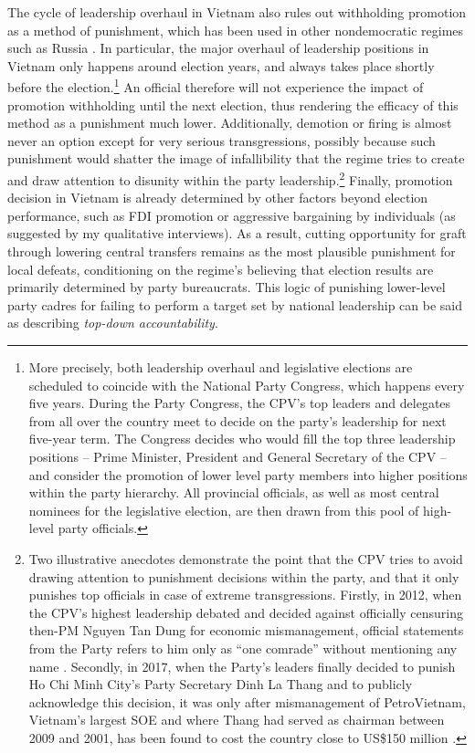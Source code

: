 \documentclass[12pt]{article}\usepackage[]{graphicx}\usepackage[]{color}
\newcommand{\1}{\mathbbm{1}}
\begin{document}
The cycle of leadership overhaul in Vietnam also rules out withholding promotion as a method of punishment, which has been used in other nondemocratic regimes such as Russia \citep[][136]{Myagkov2009}. In particular, the major overhaul of leadership positions in Vietnam only happens around election years, and always takes place shortly before the election.\footnote{More precisely, both leadership overhaul and legislative elections are scheduled to coincide with the National Party Congress, which happens every five years. During the Party Congress, the CPV's top leaders and delegates from all over the country meet to decide on the party's leadership for next five-year term. The Congress decides who would fill the top three leadership positions -- Prime Minister, President and General Secretary of the CPV -- and consider the promotion of lower level party members into higher positions within the party hierarchy. All provincial officials, as well as most central nominees for the legislative election, are then drawn from this pool of high-level party officials.} An official therefore will not experience the impact of promotion withholding until the next election, thus rendering the efficacy of this method as a punishment much lower. Additionally, demotion or firing is almost never an option except for very serious transgressions, possibly because such punishment would shatter the image of infallibility that the regime tries to create and draw attention to disunity within the party leadership.\footnote{Two illustrative anecdotes demonstrate the point that the CPV tries to avoid drawing attention to punishment decisions within the party, and that it only punishes top officials in case of extreme transgressions. Firstly, in 2012, when the CPV's highest leadership debated and decided against officially censuring then-PM Nguyen Tan Dung for economic mismanagement, official statements from the Party refers to him only as ``one comrade'' without mentioning any name \citep{voa2012}. Secondly, in 2017, when the Party's leaders finally decided to punish Ho Chi Minh City's Party Secretary Dinh La Thang and to publicly acknowledge this decision, it was only after mismanagement of PetroVietnam, Vietnam's largest SOE and where Thang had served as chairman between 2009 and 2001, has been found to cost the country close to US\$150 million \citep{BBC2017}.} Finally, promotion decision in Vietnam is already determined by other factors beyond election performance, such as FDI promotion \citep{JensenMalesky2018} or aggressive bargaining by individuals (as suggested by my qualitative interviews). As a result, cutting opportunity for graft through lowering central transfers remains as the most plausible punishment for local defeats, conditioning on the regime’s believing that election results are primarily determined by party bureaucrats. This logic of punishing lower-level party cadres for failing to perform a target set by national leadership can be said as describing \textit{top-down accountability}.
\end{document}
